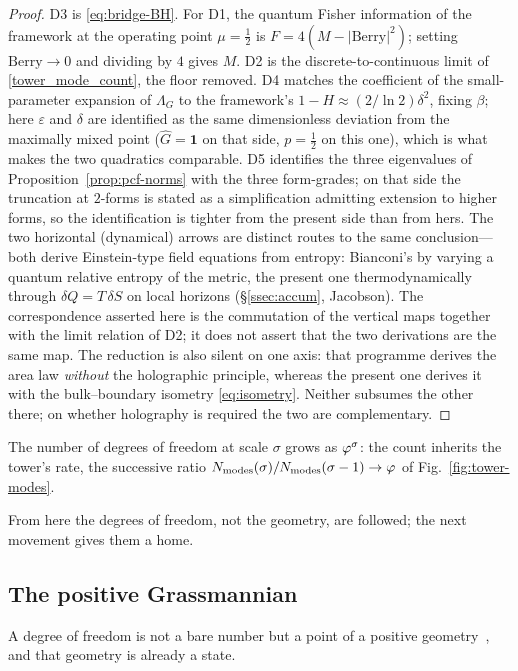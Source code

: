 \begin{proof}
D3 is \eqref{eq:bridge-BH}. For D1, the quantum Fisher information of the framework at the operating point
$\mu=\tfrac12$ is $F=4(M-|\mathrm{Berry}|^2)$; setting $\mathrm{Berry}\to0$ and dividing by $4$
gives $M$. D2 is the discrete-to-continuous limit of \eqref{tower_mode_count}, the floor removed.
D4 matches the coefficient of the small-parameter expansion of $\Lambda_G$ to the framework's
$1-H\approx(2/\ln2)\delta^2$, fixing $\beta$; here $\varepsilon$ and $\delta$ are identified as the
same dimensionless deviation from the maximally mixed point ($\hat G=\mathbf 1$ on that side,
$p=\tfrac12$ on this one), which is what makes the two quadratics comparable. D5 identifies the three eigenvalues of
Proposition~\ref{prop:pcf-norms} with the three form-grades; on that side the truncation at
$2$-forms is stated as a simplification admitting extension to higher forms, so the identification
is tighter from the present side than from hers. The two horizontal (dynamical) arrows
are distinct routes to the same conclusion---both derive Einstein-type field equations from
entropy: Bianconi's by varying a quantum relative entropy of the metric, the present one
thermodynamically through $\delta Q=T\,\delta S$ on local horizons (\S\ref{ssec:accum},
Jacobson). The correspondence asserted here is the commutation of the vertical maps together with
the limit relation of D2; it does not assert that the two derivations are the same map. The
reduction is also silent on one axis: that programme derives the area law \emph{without} the
holographic principle, whereas the present one derives it with the bulk--boundary isometry
\eqref{eq:isometry}. Neither subsumes the other there; on whether holography is required the two
are complementary.
\end{proof}

\begin{corollary}\label{golden_growth_per_level}
The number of degrees of freedom at scale $\sigma$ grows as $\varphi^{\sigma}$: the count inherits
the tower's rate, the successive ratio $N_{\mathrm{modes}}(\sigma)/N_{\mathrm{modes}}(\sigma-1)\to\varphi$ of
Fig.~\ref{fig:tower-modes}.


\end{corollary}

From here the degrees of freedom, not the geometry, are followed; the next movement gives them a
home.

\subsection{The positive Grassmannian}\label{ssec:grass}
A degree of freedom is not a bare number but a point of a positive geometry~\cite{Postnikov,BengtssonZyczkowski}, and that geometry is
already a state.

